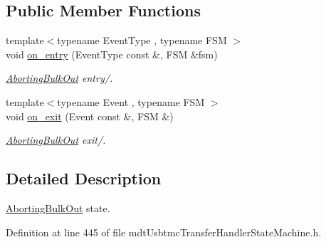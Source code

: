 \subsection*{Public Member Functions}
\begin{DoxyCompactItemize}
\item 
{\footnotesize template$<$typename Event\-Type , typename F\-S\-M $>$ }\\void \hyperlink{structmdt_usbtmc_transfer_handler_state_machine_1_1_running___1_1_aborting_bulk_out_aec7eb25c4b0f766ae0e86fa15fc6ae53}{on\-\_\-entry} (Event\-Type const \&, F\-S\-M \&fsm)
\begin{DoxyCompactList}\small\item\em \hyperlink{structmdt_usbtmc_transfer_handler_state_machine_1_1_running___1_1_aborting_bulk_out}{Aborting\-Bulk\-Out} entry/. \end{DoxyCompactList}\item 
{\footnotesize template$<$typename Event , typename F\-S\-M $>$ }\\void \hyperlink{structmdt_usbtmc_transfer_handler_state_machine_1_1_running___1_1_aborting_bulk_out_ac23c4f6b256908b0e9755aee19e56160}{on\-\_\-exit} (Event const \&, F\-S\-M \&)
\begin{DoxyCompactList}\small\item\em \hyperlink{structmdt_usbtmc_transfer_handler_state_machine_1_1_running___1_1_aborting_bulk_out}{Aborting\-Bulk\-Out} exit/. \end{DoxyCompactList}\end{DoxyCompactItemize}


\subsection{Detailed Description}
\hyperlink{structmdt_usbtmc_transfer_handler_state_machine_1_1_running___1_1_aborting_bulk_out}{Aborting\-Bulk\-Out} state. 

Definition at line 445 of file mdt\-Usbtmc\-Transfer\-Handler\-State\-Machine.\-h.



